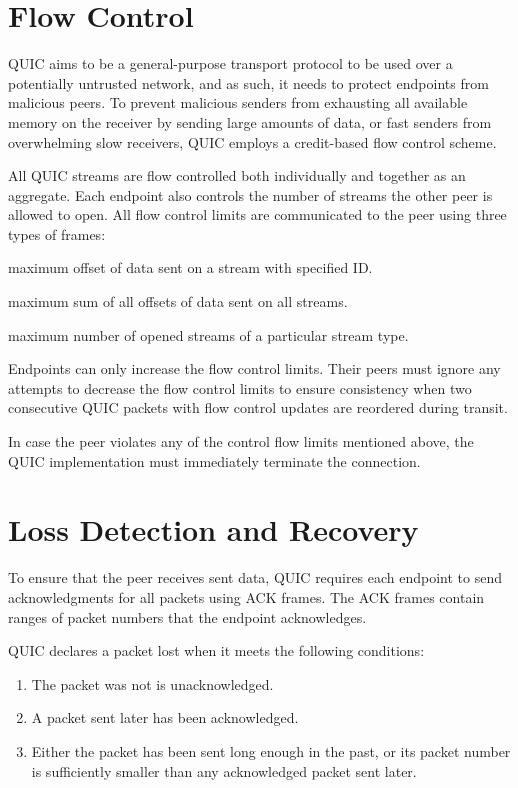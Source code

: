 \section{Flow Control}

QUIC aims to be a general-purpose transport protocol to be used over a potentially untrusted
network, and as such, it needs to protect endpoints from malicious peers. To prevent malicious
senders from exhausting all available memory on the receiver by sending large amounts of data, or
fast senders from overwhelming slow receivers, QUIC employs a credit-based flow control scheme.

All QUIC streams are flow controlled both individually and together as an aggregate. Each endpoint
also controls the number of streams the other peer is allowed to open. All flow control limits are
communicated to the peer using three types of frames:

\begin{itemize}

 maximum offset of data sent on a stream with specified ID\@.

 maximum sum of all offsets of data sent on all streams.

 maximum number of opened streams of a particular stream type.

\end{itemize}

Endpoints can only increase the flow control limits. Their peers must ignore any attempts to
decrease the flow control limits to ensure consistency when two consecutive QUIC packets with flow
control updates are reordered during transit.

In case the peer violates any of the control flow limits mentioned above, the QUIC implementation
must immediately terminate the connection.

\section{Loss Detection and Recovery}

To ensure that the peer receives sent data, QUIC requires each endpoint to send acknowledgments for
all packets using ACK frames. The ACK frames contain ranges of packet numbers that the endpoint
acknowledges.

QUIC declares a packet lost when it meets the following conditions:

\begin{enumerate}

  \item The packet was not is unacknowledged.

  \item A packet sent later has been acknowledged.

  \item Either the packet has been sent long enough in the past, or its packet number is
sufficiently smaller than any acknowledged packet sent later.

\end{enumerate}

